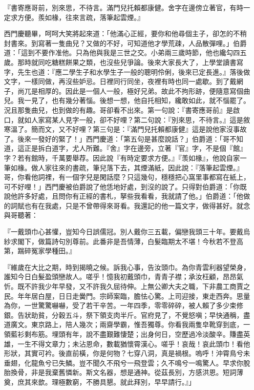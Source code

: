 『書寄應哥前，別來思，不待言。滿門兒托賴都康健。舍字在邊傍立著官，有時一定求方便。羨如椽，往來言疏，落筆起雲煙。』

西門慶聽畢，呵呵大笑將起來道：「他滿心正經，要你和他尋個主子，卻怎的不稍封書來。到寫著一隻曲兒？又做的不好，可知道他才學荒疎，人品散彈哩。」伯爵道：「這到不要作准他。只為他與我是三世之交。小弟兩三歲時節，他也纔勾四五歲。那時就同吃糖糕餅果之類，也沒些兒爭論。後來大家長大了，上學堂讀書寫字，先生也道：『應二學生子和水學生子一般的聰明伶俐，後來已定長進。』落後做文字，一樣同做，再沒些妒忌。日裡同行同坐，夜裡有時也同一處歇。到了戴網子，尚兀是相厚的。因此是一個人一般，極好兄弟。故此不拘形跡，便隨意寫個曲兒。我一見了，也有幾分著惱。後想一想，他自托相知，纔敢如此，就不惱罷了。況且那隻曲兒，也到做的有趣。哥卻看不出來。第一句說：『書寄應哥前』是啟口，就如人家寫某人見字一般，卻不好哩？第二句說：『別來思，不待言。』這是敘寒溫了。簡而文，又不好哩？第三句是：『滿門兒托賴都康健』這是說他家沒事故了。後來一發好的緊了！」西門慶道：「第五句是甚麼說話？」伯爵道：「哥不知道，這正是拆白道字，尤人所難。『舍』字在邊旁，立著『官』字，不是個『館』字？若有館時，千萬要舉荐。因此說『有時定要求方便。』『羡如椽』，他說自家一筆如椽。做人家往來的書疏，筆兒落下去，其煙滿紙，因此說：『落筆起雲煙。』哥，你看他詞裡，有一個字兒是閑話麼？只這幾句，穩穩把心窩里事都寫在紙上，可不好哩！」西門慶被伯爵說了他恁地好處，到沒的說了。只得對伯爵道：「你既說他許多好處，且問你有正經的書札，拏些我看看，我就請了他。」伯爵道：「他做的詞賦也有在我處，只是不曾帶得來哥看。我還記的他一篇文字，做得甚好。就念與哥聽著：

『一戴頭巾心甚懽，豈知今日誤儒冠。別人戴你三五載，偏戀我頭三十年。要戴烏紗求閣下，做篇詩句別尊前。此番非是吾情薄，白髮臨期太不堪！今秋若不登高第，踹碎冤家學種田。』

『維歲在大比之期，時到揭曉之候。訴我心事，告汝頭巾。為你青雲利器望榮身，誰知今日白髮盈頭戀故人。嗟乎！憶我初戴頭巾，青青子襟；承汝枉顧，昂昂氣忻。既不許我少年早發，又不許我久屈待伸。上無公卿大夫之職，下非農工商賈之民。年年居白屋，日日走黌門。宗師案臨，膽怯心驚。上司迎接，東走西奔。思量為你，一世驚驚嚇嚇，受了若干辛苦。一年四季，零零碎碎，被人賴了多少束修銀。告狀助貧，分穀五斗，祭下領支肉半斤。官府見了，不覺怒嗔；早快通稱，盡道廣文。東京路上，陪人幾次；兩齋學霸，惟吾獨尊。你看我兩隻皁靴穿到底，一領藍衫剩布筋。埋頭有年，說不盡艱難悽楚；出身何日，空歷過冷淡酸辛。賺盡英雄，一生不得文章力；未沾恩命，數載猶懷霄漢心。嗟乎！哀哉！哀此頭巾！看他形狀，其實可衿。後直前橫，你是何物？七穿八洞，真是禍根。嗚呼！沖霄鳥兮未垂翅，化龍魚兮已失鱗。豈不聞久不飛兮一飛登雲；久不鳴兮一鳴驚人。早求你脫胎換骨，非是我棄舊憐新。斯文名器，想是通神。從茲長別，方感洪恩。短詞薄奠，庶其來歆。理極數窮，不勝具懇。就此拜別，早早請行。』」

